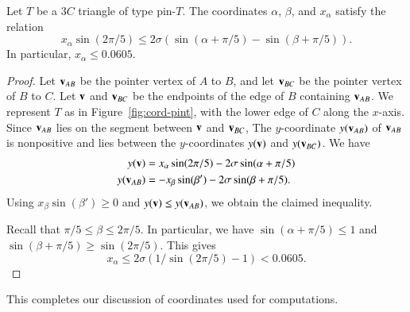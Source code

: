 \begin{lemma}\label{lemma:0605}
  Let $T$ be a $3C$ triangle of type pin-$T$.  The coordinates
  $\alpha$, $\beta$, and $x_\alpha$ satisfy the relation
\[
x_\alpha \sin(2\pi/5) \le 2\sigma (\sin(\alpha+\pi/5) - \sin(\beta+\pi/5)).
\]
In particular, $x_\alpha \le 0.0605$.
\end{lemma}

\begin{proof} Let ${\mathbf v}_{AB}$ be the pointer vertex of $A$ to $B$, and
  let ${\mathbf v}_{BC}$ be the pointer vertex of $B$ to $C$.  Let ${\mathbf v}$ and
  ${\mathbf v}_{BC}$ be the endpoints of the edge of $B$ containing ${\mathbf v}_{AB}$.
  We represent $T$ as in Figure~\ref{fig:cord-pint}, with the lower edge of
  $C$ along the $x$-axis.  Since ${\mathbf v}_{AB}$ lies on the segment between
  ${\mathbf v}$ and ${\mathbf v}_{BC}$, The $y$-coordinate $y({\mathbf v}_{AB})$ of ${\mathbf v}_{AB}$ is
  nonpositive and lies between the $y$-coordinates $y({\mathbf v})$ and
  $y({\mathbf v}_{BC})$.  We have
\begin{align*}
y({\mathbf v}) &= x_\alpha \sin(2\pi/5) - 2\sigma\sin(\alpha+\pi/5)\\
y({\mathbf v}_{AB}) & = -x_\beta \sin(\beta') - 2\sigma\sin(\beta+\pi/5).
\end{align*}
Using $x_\beta \sin(\beta')\ge 0$ and $y({\mathbf v}) \le y({\mathbf v}_{AB})$, we
obtain the claimed inequality.

Recall that $\pi/5\le \beta \le 2\pi/5$.  In particular, we have
$\sin(\alpha+\pi/5) \le 1$ and $\sin(\beta+\pi/5)\ge \sin(2\pi/5)$.
This gives
\[
x_\alpha \le 2\sigma(1/\sin(2\pi/5) - 1) < 0.0605.
\]
\end{proof}


This completes our discussion of coordinates used for computations.

